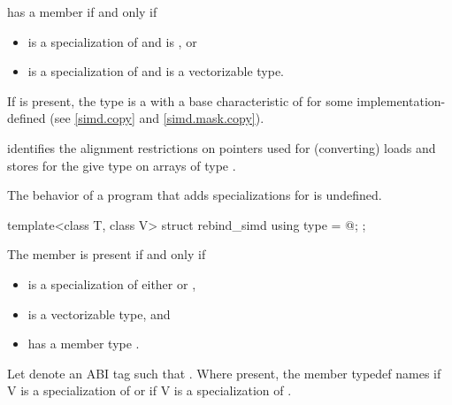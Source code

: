 \begin{itemdescr}
\pnum
{} has a member  if and only if
\begin{itemize}
  \item {} is a specialization of  and  is , or
  \item {} is a specialization of  and  is a vectorizable type.
\end{itemize}

\pnum
If  is present, the type  is a  with a base characteristic of  for some implementation-defined  (see \ref{simd.copy} and \ref{simd.mask.copy}). \begin{note} identifies the alignment restrictions on pointers used for (converting) loads and stores for the give type  on arrays of type .\end{note}

\pnum
The behavior of a program that adds specializations for  is undefined.
\end{itemdescr}

\begin{itemdecl}
template<class T, class V> struct rebind_simd { using type = @\seebelow@; };
\end{itemdecl}

\begin{itemdescr}
  \pnum
  The member  is present if and only if
  \begin{itemize}
    \item {} is a specialization of either  or
      ,
    \item {} is a vectorizable type, and
    \item {} has a member type .
  \end{itemize}

  \pnum
  Let  denote an ABI tag such that .
  Where present, the member typedef  names  if \tcode V is a specialization of  or
   if \tcode V is a specialization of
  .
\end{itemdescr}


